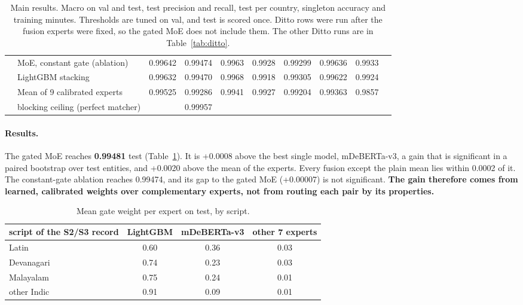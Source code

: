 \begin{table}[t]
{\begin{tabular}{llcccccccc}
 & MoE, constant gate (ablation)        & 0.99642 & 0.99474 & 0.9963 & 0.9928 & 0.99299 & 0.99636 & 0.9933 & \\
 & LightGBM stacking                    & 0.99632 & 0.99470 & 0.9968 & 0.9918 & 0.99305 & 0.99622 & 0.9924 & \\
 & Mean of 9 calibrated experts         & 0.99525 & 0.99286 & 0.9941 & 0.9927 & 0.99204 & 0.99363 & 0.9857 & \\
\midrule
 & blocking ceiling (perfect matcher)   &         & 0.99957 & & & & & & \\
\bottomrule
\end{tabular}}
\caption{Main results. Macro \fhalf{} on val and test, test precision and recall, test \fhalf{} per
country, singleton accuracy and training minutes. Thresholds are tuned on val, and test is scored once.
Ditto rows were run after the fusion experts were fixed, so the gated MoE does not include them. The other Ditto runs are in Table~\ref{tab:ditto}.}
\label{tab:main}
\end{table}

\paragraph{Results.} The gated MoE reaches \textbf{0.99481} test \fhalf{} (Table~\ref{tab:main}). It is
+0.0008 above the best single model, mDeBERTa-v3, a gain that is significant in a paired bootstrap over test
entities, and +0.0020 above the mean of the experts. Every fusion except the plain mean lies within
0.0002 of it. The constant-gate ablation reaches 0.99474, and its gap to the gated MoE (+0.00007) is not
significant. \textbf{The gain therefore comes from learned, calibrated weights over complementary experts,
not from routing each pair by its properties.}

\begin{table}[h]
\centering\small
\begin{tabular}{lccc}
\toprule
script of the S2/S3 record & LightGBM & mDeBERTa-v3 & other 7 experts \\
\midrule
Latin       & 0.60 & 0.36 & 0.03 \\
Devanagari  & 0.74 & 0.23 & 0.03 \\
Malayalam   & 0.75 & 0.24 & 0.01 \\
other Indic & 0.91 & 0.09 & 0.01 \\
\bottomrule
\end{tabular}
\caption{Mean gate weight per expert on test, by script.}
\label{tab:gate}
\end{table}

